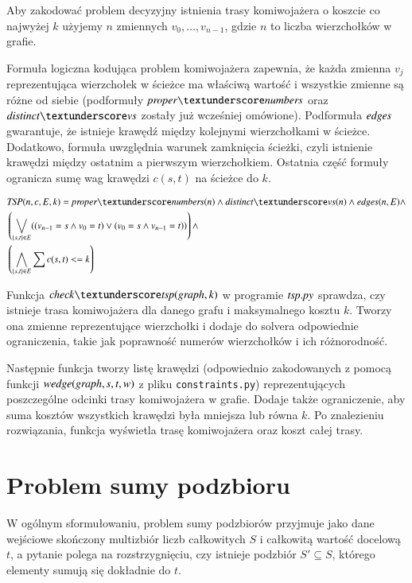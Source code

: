 Aby zakodować problem decyzyjny istnienia trasy komiwojażera o koszcie co najwyżej $k$ użyjemy $n$ zmiennych $v_0,\ldots,v_{n-1}$, gdzie $n$ to liczba wierzchołków w grafie.

Formuła logiczna kodująca problem komiwojażera zapewnia, że każda zmienna \(v_j\) reprezentująca wierzchołek w ścieżce ma właściwą wartość i wszystkie zmienne są różne od siebie (podformuły $\propernumbers$ oraz $\distinctvs$ zostały już wcześniej omówione). Podformuła ${\mathit{edges}}$ gwarantuje, że istnieje krawędź między kolejnymi wierzchołkami w ścieżce. Dodatkowo, formuła uwzględnia warunek zamknięcia ścieżki, czyli istnienie krawędzi między ostatnim a pierwszym wierzchołkiem. Ostatnia część formuły ogranicza sumę wag krawędzi $c(s, t)$ na ścieżce do \(k\).

\begin{align*}
	&\TSP(n, c, E, k) = \propernumbers(n) \land \distinctvs(n) \land \edges(n, E) \land \\
	&\left( \bigvee_{\{s,t\} \in E} ((v_{n-1} = s \land v_0 = t) \lor (v_0 = s \land v_{n-1} = t)) \right) \land \\
	&\left( \bigwedge_{\{s,t\} \in E} \sum c(s,t) <= k \right)
\end{align*}

Funkcja $\checktsp$ w programie ${\mathit{tsp.py}}$ sprawdza, czy istnieje trasa komiwojażera dla danego grafu i maksymalnego kosztu $k$. Tworzy ona zmienne reprezentujące wierzchołki i dodaje do solvera odpowiednie ograniczenia, takie jak poprawność numerów wierzchołków i ich różnorodność.

Następnie funkcja tworzy listę krawędzi (odpowiednio zakodowanych z pomocą funkcji ${\mathit{wedge(graph, s, t, w)}}$ z pliku \texttt{constraints.py}) reprezentujących poszczególne odcinki trasy komiwojażera w grafie. Dodaje także ograniczenie, aby suma kosztów wszystkich krawędzi była mniejsza lub równa $k$. Po znalezieniu rozwiązania, funkcja wyświetla trasę komiwojażera oraz koszt całej trasy.




\section{Problem sumy podzbioru}
W ogólnym sformułowaniu, problem sumy podzbiorów przyjmuje jako dane wejściowe
skończony multizbiór liczb całkowitych $S$ i całkowitą wartość docelową $t$,
a pytanie polega na rozstrzygnięciu, czy istnieje podzbiór $S' \subseteq S$,
którego elementy sumują się dokładnie do $t$.


